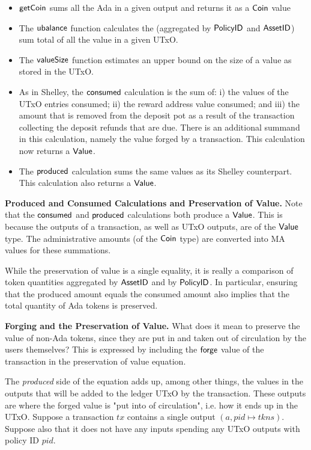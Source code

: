 \begin{itemize}

  \item $\mathsf{getCoin}$ sums all the Ada in a given output and returns it as a
  $\mathsf{Coin}$ value

  \item
    The $\mathsf{ubalance}$ function calculates the (aggregated by $\mathsf{PolicyID}$ and
    $\mathsf{AssetID}$) sum total of all the value in a given UTxO.

  \item
    The $\mathsf{valueSize}$ function estimates an upper bound on the size of a value
    as stored in the UTxO.

  \item As in Shelley, the $\mathsf{consumed}$ calculation is the sum of: i) the values of the
   UTxO entries consumed; ii) the reward address value consumed;
   and iii) the amount that is removed from the deposit pot as a result of
   the transaction collecting the deposit refunds that are due. There is an additional
   summand in this calculation, namely the value forged by a transaction.
   This calculation now returns a $\mathsf{Value}$.

  \item The $\mathsf{produced}$ calculation sums the same values
  as its Shelley counterpart.
  This calculation also returns a $\mathsf{Value}$.
\end{itemize}

\textbf{Produced and Consumed Calculations and Preservation of Value.}
Note that
the $\mathsf{consumed}$ and $\mathsf{produced}$ calculations both produce a $\mathsf{Value}$.
This is because the outputs of a transaction, as well as UTxO outputs,
are of the $\mathsf{Value}$ type. The administrative amounts (of the $\mathsf{Coin}$ type)
are converted into MA values for these summations.

While the preservation of value is a single
equality, it is really a comparison of token quantities aggregated by
$\mathsf{AssetID}$ and by $\mathsf{PolicyID}$. In particular, ensuring that the produced
amount equals the consumed amount also implies that the total quantity of
Ada tokens is preserved.

\textbf{Forging and the Preservation of Value.}
What does it mean to preserve the value of non-Ada tokens, since they
are put in and taken out of circulation by the users themselves?
This is expressed by including the $\mathsf{forge}$ value of the transaction
in the preservation of value equation.

The \textit{produced} side of the equation adds up, among other things, the
values in the
outputs that will be added to the ledger UTxO by the transaction. These outputs are
where the
forged value is "put into of circulation", i.e. how it ends up in the UTxO.
Suppose a transaction $tx$ contains a single output $(a, pid \mapsto tkns)$. Suppose
also that it does not
have any inputs spending any UTxO outputs with policy ID $pid$.

